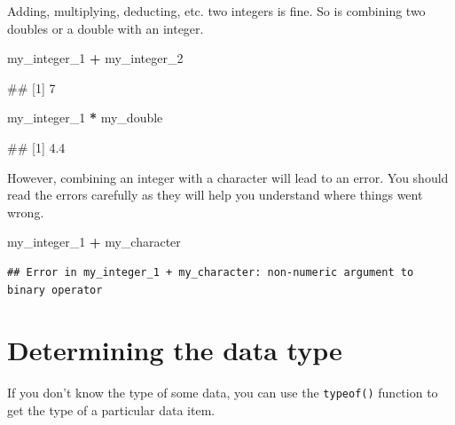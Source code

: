 \documentclass[
]{book}
\newenvironment{Shaded}{\begin{snugshade}}{\end{snugshade}}
\newcommand{\NormalTok}[1]{#1}
\newcommand{\SpecialCharTok}[1]{\textcolor[rgb]{0.81,0.36,0.00}{\textbf{#1}}}
\begin{document}
Adding, multiplying, deducting, etc. two integers is fine. So is combining two doubles or a double with an integer.

\begin{Shaded}
\begin{Highlighting}[]
\NormalTok{my\_integer\_1 }\SpecialCharTok{+}\NormalTok{ my\_integer\_2}
\end{Highlighting}
\end{Shaded}

\begin{Shaded}
\begin{Highlighting}[]
\NormalTok{\#\# [1] 7}
\end{Highlighting}
\end{Shaded}

\begin{Shaded}
\begin{Highlighting}[]
\NormalTok{my\_integer\_1 }\SpecialCharTok{*}\NormalTok{ my\_double}
\end{Highlighting}
\end{Shaded}

\begin{Shaded}
\begin{Highlighting}[]
\NormalTok{\#\# [1] 4.4}
\end{Highlighting}
\end{Shaded}

However, combining an integer with a character will lead to an error. You should read the errors carefully as they will help you understand where things went wrong.

\begin{Shaded}
\begin{Highlighting}[]
\NormalTok{my\_integer\_1 }\SpecialCharTok{+}\NormalTok{ my\_character}
\end{Highlighting}
\end{Shaded}

\begin{verbatim}
## Error in my_integer_1 + my_character: non-numeric argument to binary operator
\end{verbatim}

\hypertarget{determining-the-data-type}{%
\section{Determining the data type}\label{determining-the-data-type}}

If you don't know the type of some data, you can use the \texttt{typeof()} function to get the type of a particular data item.
\end{document}

